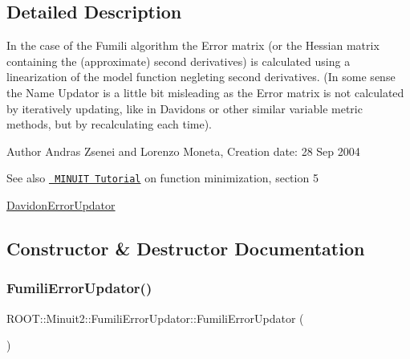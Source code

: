 \subsection{Detailed Description}
In the case of the Fumili algorithm the Error matrix (or the Hessian matrix containing the (approximate) second derivatives) is calculated using a linearization of the model function negleting second derivatives. (In some sense the Name Updator is a little bit misleading as the Error matrix is not calculated by iteratively updating, like in Davidon\textquotesingle{}s or other similar variable metric methods, but by recalculating each time).

\begin{DoxyAuthor}{Author}
Andras Zsenei and Lorenzo Moneta, Creation date\+: 28 Sep 2004
\end{DoxyAuthor}
\begin{DoxySeeAlso}{See also}
\href{http://www.cern.ch/winkler/minuit/tutorial/mntutorial.pdf}{\texttt{ M\+I\+N\+U\+IT Tutorial}} on function minimization, section 5

\mbox{\hyperlink{classROOT_1_1Minuit2_1_1DavidonErrorUpdator}{Davidon\+Error\+Updator}} 
\end{DoxySeeAlso}


\subsection{Constructor \& Destructor Documentation}
\mbox{\label{classROOT_1_1Minuit2_1_1FumiliErrorUpdator_a6f6a3c5b10d58710f4d26b431e89907b}} 
\subsubsection{\texorpdfstring{FumiliErrorUpdator()}{FumiliErrorUpdator()}\hspace{0.1cm}{\footnotesize\ttfamily [1/2]}}
{\footnotesize\ttfamily R\+O\+O\+T\+::\+Minuit2\+::\+Fumili\+Error\+Updator\+::\+Fumili\+Error\+Updator (\begin{DoxyParamCaption}{ }\end{DoxyParamCaption})\hspace{0.3cm}{\ttfamily [inline]}}

